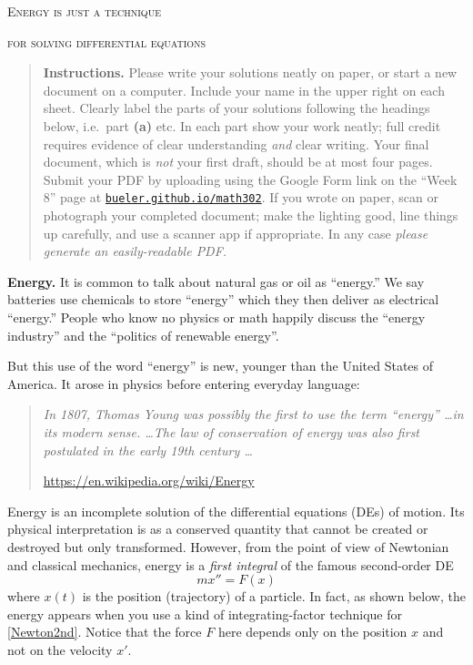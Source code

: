 \documentclass[12pt]{article}
\theoremstyle{definition}
\begin{document}
\renewcommand{\d}{\displaystyle}

\strut
\centerline{{\Large \textsc{Energy is just a technique}}}

\medskip

\centerline{{\Large \textsc{for solving differential equations}}}

\medskip
\small
\begin{quote}
\textbf{Instructions.}  Please write your solutions neatly on paper, or start a new document on a computer.  Include your name in the upper right on each sheet.  Clearly label the parts of your solutions following the headings below, i.e.~part \textbf{(a)} etc.  In each part show your work neatly; full credit requires evidence of clear understanding \emph{and} clear writing.  Your final document, which is \emph{not} your first draft, should be at most four pages.  Submit your PDF by uploading using the Google Form link on the ``Week 8'' page at \href{https://bueler.github.io/math302/index.html}{\texttt{bueler.github.io/math302}}.  If you wrote on paper, scan or photograph your completed document; make the lighting good, line things up carefully, and use a scanner app if appropriate.  In any case \emph{please generate an easily-readable PDF.}
\end{quote}

\normalsize
\bigskip
\renewcommand{\baselinestretch}{1.1}

\textbf{Energy.}  It is common to talk about natural gas or oil as ``energy.''   We say batteries use chemicals to store ``energy'' which they then deliver as electrical ``energy.''  People who know no physics or math happily discuss the ``energy industry'' and the ``politics of renewable energy''.

But this use of the word ``energy'' is new, younger than the United States of America.  It arose in physics before entering everyday language:

\small

\begin{quotation}
\noindent \emph{In 1807, Thomas Young was possibly the first to use the term ``energy'' \dots in its modern sense.  \dots  The law of conservation of energy was also first postulated in the early 19th century \dots}

\hfill \url{https://en.wikipedia.org/wiki/Energy}
\end{quotation}

\normalsize
Energy is an incomplete solution of the differential equations (DEs) of motion.  Its physical interpretation is as a conserved quantity that cannot be created or destroyed but only transformed.  However, from the point of view of Newtonian and classical mechanics, energy is a \emph{first integral} of the famous second-order DE
\begin{equation}
    mx''=F(x)  \label{Newton2nd}
\end{equation}
where $x(t)$ is the position (trajectory) of a particle.  In fact, as shown below, the energy appears when you use a kind of integrating-factor technique for \eqref{Newton2nd}.  Notice that the force $F$ here depends only on the position $x$ and not on the velocity $x'$.
\end{document}
